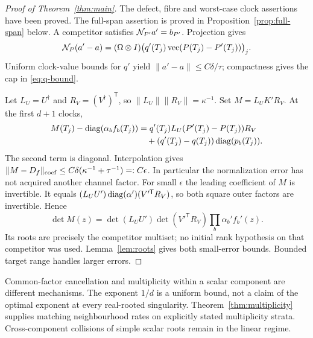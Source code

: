 \begin{proof}[Proof of Theorem~\ref{thm:main}]
The defect, fibre and worst-case clock assertions have been proved.
The full-span assertion is proved in Proposition~\ref{prop:full-span}
below. A competitor satisfies $\mathcal N_{P'}a'=b_{P'}$. Projection gives
\begin{equation}\label{eq:normalization-difference}
 \mathcal N_P(a'-a)=(\Omega\otimes I)
       \big(q'(T_j)\operatorname{vec}(P(T_j)-P'(T_j))\big)_j.
\end{equation}
Uniform clock-value bounds for $q'$ yield $\|a'-a\|\le C\delta/\tau$;
compactness gives the cap in \eqref{eq:q-bound}.

Let $L_U=U^\dagger$ and $R_V=(V^\dagger)^{\mathsf T}$, so
$\|L_U\|\|R_V\|=\kappa^{-1}$. Set $M=L_UK'R_V$. At the first
$d+1$ clocks,
\begin{align}
 M(T_j)-\operatorname{diag}(\alpha_bf_b(T_j))
 &=q'(T_j)L_U(P'(T_j)-P(T_j))R_V\nonumber\\
 &\quad+(q'(T_j)-q(T_j))\operatorname{diag}(p_b(T_j)).
                                                        \label{eq:diagonal-error}
\end{align}
The second term is diagonal. Interpolation gives
$\|M-D_f\|_{\rm coef}\le C\delta(\kappa^{-1}+\tau^{-1})=:C\epsilon$.
In particular the normalization error has not acquired another channel
factor. For small $\epsilon$ the leading coefficient of $M$ is
invertible. It equals
$(L_UU')\operatorname{diag}(\alpha')(V'^{\mathsf T}R_V)$, so both square outer
factors are invertible. Hence
\[
 \det M(z)=\det(L_UU')\det(V'^{\mathsf T}R_V)
                           \prod_b\alpha_b'f_b'(z).
\]
Its roots are precisely the competitor multiset; no initial rank
hypothesis on that competitor was used. Lemma~\ref{lem:roots} gives
both small-error bounds. Bounded target range handles larger errors.
\end{proof}

\begin{remark}
Common-factor cancellation and multiplicity within a scalar component
are different mechanisms. The exponent $1/d$ is a uniform bound, not
a claim of the optimal exponent at every real-rooted singularity.
Theorem~\ref{thm:multiplicity} supplies matching neighbourhood rates
on explicitly stated multiplicity strata. Cross-component collisions
of simple scalar roots remain in the linear regime.
\end{remark}
